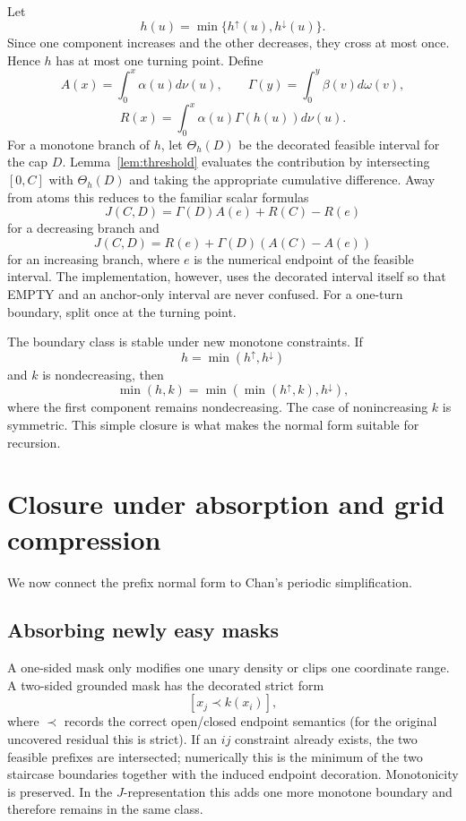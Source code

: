 \documentclass[12pt,a4paper]{article}
\theoremstyle{definition}
\newcommand{\1}{\mathbf 1}
\begin{document}
Let
\[
h(u)=\min\{h^\uparrow(u),h^\downarrow(u)\}.
\]
Since one component increases and the other decreases, they cross at most once. Hence $h$ has at most one turning point. Define
\[
A(x)=\int_0^x\alpha(u)d\nu(u),\qquad
\Gamma(y)=\int_0^y\beta(v)d\omega(v),
\]
\[
R(x)=\int_0^x\alpha(u)\Gamma(h(u))d\nu(u).
\]
For a monotone branch of $h$, let $\Theta_h(D)$ be the decorated feasible interval for the cap $D$.  Lemma~\ref{lem:threshold} evaluates the contribution by intersecting $[0,C]$ with $\Theta_h(D)$ and taking the appropriate cumulative difference.  Away from atoms this reduces to the familiar scalar formulas
\[
J(C,D)=\Gamma(D)A(e)+R(C)-R(e)
\]
for a decreasing branch and
\[
J(C,D)=R(e)+\Gamma(D)(A(C)-A(e))
\]
for an increasing branch, where $e$ is the numerical endpoint of the feasible interval.  The implementation, however, uses the decorated interval itself so that EMPTY and an anchor-only interval are never confused.  For a one-turn boundary, split once at the turning point.

The boundary class is stable under new monotone constraints. If
\[
h=\min(h^\uparrow,h^\downarrow)
\]
and $k$ is nondecreasing, then
\[
\min(h,k)=\min(\min(h^\uparrow,k),h^\downarrow),
\]
where the first component remains nondecreasing. The case of nonincreasing $k$ is symmetric. This simple closure is what makes the normal form suitable for recursion.

\section{Closure under absorption and grid compression}

We now connect the prefix normal form to Chan's periodic simplification.

\subsection{Absorbing newly easy masks}

A one-sided mask only modifies one unary density or clips one coordinate range. A two-sided grounded mask has the decorated strict form
\[
[x_j\prec k(x_i)],
\]
where $\prec$ records the correct open/closed endpoint semantics (for the original uncovered residual this is strict).  If an $ij$ constraint already exists, the two feasible prefixes are intersected; numerically this is the minimum of the two staircase boundaries together with the induced endpoint decoration.  Monotonicity is preserved.  In the $J$-representation this adds one more monotone boundary and therefore remains in the same class.
\end{document}
